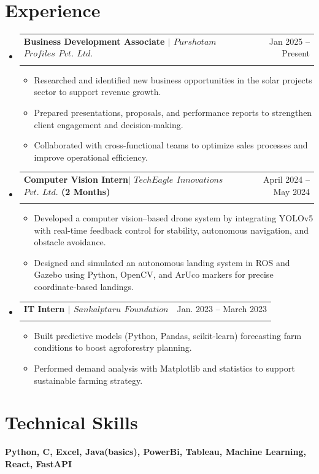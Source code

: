 \documentclass[letterpaper,11pt]{article}
\makeatletter
\newcommand{\resumeItem}[1]{
  \item\small{
    {#1 \vspace{-2pt}}
  }
}
\newcommand{\resumeSubheading}[4]{
  \vspace{-2pt}\item
    \begin{tabular*}{0.97\textwidth}[t]{l@{\extracolsep{\fill}}r}
      \textbf{#1} & #2 \\
      \textit{\small #3} & \textit{\small #4} \\
    \end{tabular*}\vspace{-7pt}
}
\newcommand{\resumeSubHeadingListStart}{\begin{itemize}[leftmargin=0.15in,topmargin=0.10in, label={}]}
\newcommand{\resumeSubHeadingListEnd}{\end{itemize}\vspace{-10pt}}
\newcommand{\resumeItemListStart}{\begin{itemize}\vspace{-5pt}}
\newcommand{\resumeItemListEnd}{\end{itemize}\vspace{-4pt}}
\makeatother
\begin{document}
\section{Experience}
  \resumeSubHeadingListStart
    \resumeSubheading
      {Business Development Associate $|$ $Purshotam$ $Profiles$ $Pvt.$ $Ltd.$ }{Jan 2025 -- Present}
      {}{}
      \resumeItemListStart
        \resumeItem{Researched and identified new business opportunities in the solar projects sector to support revenue growth.}
        \resumeItemListEnd
        \resumeItemListStart
        \resumeItem {Prepared presentations, proposals, and performance reports to strengthen client engagement and decision-making.}
        \resumeItemListEnd
        \resumeItemListStart
        \resumeItem{Collaborated with cross-functional teams to optimize sales processes and improve operational efficiency.}
        \resumeItemListEnd
    \resumeSubheading
      {Computer Vision Intern$|$ $TechEagle$ $Innovations$ $Pvt.$ $Ltd.$ (2 Months) }{April 2024 -- May 2024}
      {}{}
      \resumeItemListStart
        \resumeItem{Developed a computer vision–based drone system by integrating YOLOv5 with real-time feedback control for stability, autonomous navigation, and obstacle avoidance.}
    \resumeItemListEnd
    \resumeItemListStart
        \resumeItem{Designed and simulated an autonomous landing system in ROS and Gazebo using Python, OpenCV, and ArUco markers for precise coordinate-based landings.}
    \resumeItemListEnd
    
    \resumeSubheading
      {IT Intern $|$ $Sankalptaru$ $Foundation$}{Jan. 2023 -- March 2023}
      {}{}
   
      \resumeItemListStart
        \resumeItem{Built predictive models (Python, Pandas, scikit-learn) forecasting farm conditions to boost agroforestry planning.}
    \resumeItemListEnd
    \resumeItemListStart
        \resumeItem{Performed demand analysis with Matplotlib and statistics to support sustainable farming strategy.}
    \resumeItemListEnd
  \resumeSubHeadingListEnd

\section{Technical Skills}
 \begin{itemize}[leftmargin= 0.2in, label={}]
    \small{\item{
     \textbf{Python, C, Excel,  Java(basics), PowerBi, Tableau, Machine Learning, React, FastAPI} \\}}
 \end{itemize}
\end{document}
